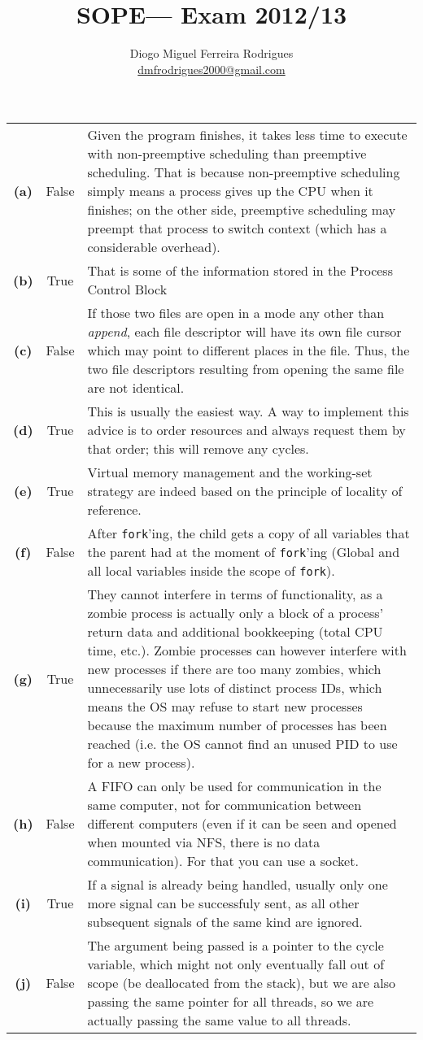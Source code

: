 \documentclass{sope}
\title{SOPE--- Exam 2012/13}
\author{Diogo Miguel Ferreira Rodrigues \\ \href{mailto:dmfrodrigues2000@gmail.com}{dmfrodrigues2000@gmail.com}}
\begin{document}
\setcounter{section}{12}
\begin{center} 
    \begin{longtable}{c | c p{132mm}}
        \textbf{(a)} & False & Given the program finishes, it takes less time to execute with non-preemptive scheduling than preemptive scheduling. That is because non-preemptive scheduling simply means a process gives up the CPU when it finishes; on the other side, preemptive scheduling may preempt that process to switch context (which has a considerable overhead). \\
        \textbf{(b)} & True & That is some of the information stored in the Process Control Block \\
        \textbf{(c)} & False & If those two files are open in a mode any other than \emph{append}, each file descriptor will have its own file cursor which may point to different places in the file. Thus, the two file descriptors resulting from opening the same file are not identical. \\
        \textbf{(d)} & True & This is usually the easiest way. A way to implement this advice is to order resources and always request them by that order; this will remove any cycles. \\
        \textbf{(e)} & True & Virtual memory management and the working-set strategy are indeed based on the principle of locality of reference. \\
        \textbf{(f)} & False & After \texttt{fork}'ing, the child gets a copy of all variables that the parent had at the moment of \texttt{fork}'ing (Global and all local variables inside the scope of \texttt{fork}). \\
        \textbf{(g)} & True & They cannot interfere in terms of functionality, as a zombie process is actually only a block of a process' return data and additional bookkeeping (total CPU time, etc.). Zombie processes can however interfere with new processes if there are too many zombies, which unnecessarily use lots of distinct process IDs, which means the OS may refuse to start new processes because the maximum number of processes has been reached (i.e. the OS cannot find an unused PID to use for a new process). \\
        \textbf{(h)} & False & A FIFO can only be used for communication in the same computer, not for communication between different computers (even if it can be seen and opened when mounted via NFS, there is no data communication). For that you can use a socket. \\
        \textbf{(i)} & True & If a signal is already being handled, usually only one more signal can be successfuly sent, as all other subsequent signals of the same kind are ignored. \\
        \textbf{(j)} & False & The argument being passed is a pointer to the cycle variable, which might not only eventually fall out of scope (be deallocated from the stack), but we are also passing the same pointer for all threads, so we are actually passing the same value to all threads.
    \end{longtable}
\end{center}
\end{document}
